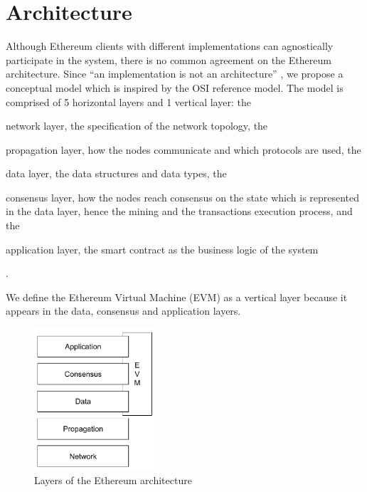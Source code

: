 \section{Architecture}


Although Ethereum clients with different implementations can agnostically
participate in the system, there is no common agreement on the Ethereum
architecture. Since ``an implementation is not an architecture''
\cite{bib:art-of-scalability}, we propose a conceptual model which is inspired
by the OSI reference model. The model is comprised of 5 horizontal layers and 1
vertical layer: the
\begin{enumerate*}[label=(\arabic*)]
  \item network layer, the specification of the network topology, the
  \item propagation layer, how the nodes communicate and which protocols
  are used, the
  \item data layer, the data structures and data types, the
  \item consensus layer, how the nodes reach consensus on the state which is
  represented in the data layer, hence the mining and the transactions execution
  process, and the
  \item application layer, the smart contract as the business logic of the
  system
\end{enumerate*}.

We define the Ethereum Virtual Machine (EVM) as a vertical layer because it
appears in the data, consensus and application layers.

\begin{figure}[H]
	\begin{center}
		\includegraphics[width=0.4\textwidth]{./res/img/architecture.pdf}
	\end{center}
	\caption{Layers of the Ethereum architecture}
	\label{fig:architecture}
\end{figure}

